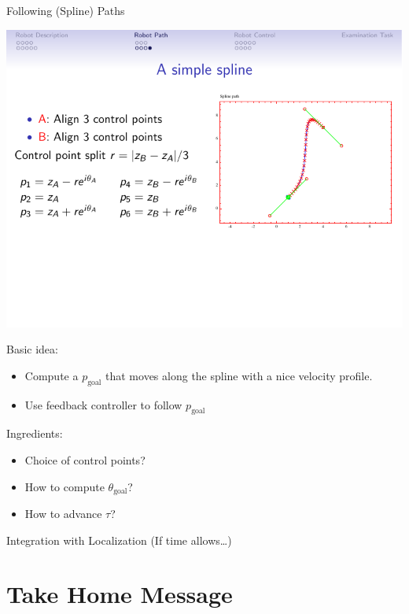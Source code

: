 \documentclass{beamer}
\begin{document}
\begin{frame}{Following (Spline) Paths}
  
  \centering
  \includegraphics[width=0.5\columnwidth]{spline-ulf-2.pdf}
  
  \begin{minipage}[t]{0.45\columnwidth}
    Basic idea:
    \begin{itemize}
    \item
      Compute a $p_\text{goal}$ that moves along the spline with a nice velocity profile.
    \item
      Use feedback controller to follow $p_\text{goal}$
    \end{itemize}
  \end{minipage}
  \hfill
  \begin{minipage}[t]{0.45\columnwidth}
    Ingredients:
    \begin{itemize}
    \item
      Choice of control points?
    \item
      How to compute $\theta_\text{goal}$?
    \item
      How to advance $\tau$?
    \end{itemize}
  \end{minipage}
  
\end{frame}


\begin{frame}{Integration with Localization}
  \centering
  (If time allows\ldots)
\end{frame}


\section{Take Home Message}
\end{document}
